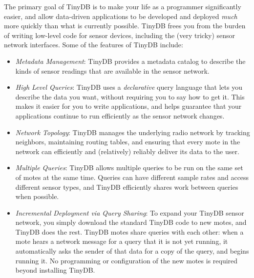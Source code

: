 \documentclass[11pt]{article}
\begin{document}
The primary goal of TinyDB is to make your life as a programmer
significantly easier, and allow data-driven applications to be
developed and deployed {\em much} more quickly than what is currently
possible.  TinyDB frees you from the burden of writing low-level code
for sensor devices, including the (very tricky) sensor network
interfaces.  Some of the features of TinyDB include:

\begin{itemize}
\item {\it Metadata Management}: TinyDB provides a metadata catalog to describe the kinds of 
sensor readings that are available in the sensor network.
\item {\it High Level Queries}: TinyDB uses a {\em
  declarative} query language that lets you
  describe the data you want, without requiring you to say how to get
  it.  This makes it easier for you to write applications, and
  helps guarantee that your applications continue to run efficiently
  as the sensor network changes.
\item {\it Network Topology}: TinyDB manages the underlying radio network by tracking
neighbors, maintaining routing tables, and ensuring that every mote in the
network can efficiently and (relatively) reliably deliver its data to the user.
\item {\it Multiple Queries}: TinyDB allows multiple queries to be run on the same
set of motes at the same time.  Queries can have different sample rates and
access different sensor types, and TinyDB efficiently shares work between
queries when possible.
\item {\it Incremental Deployment via Query Sharing}: To expand your
TinyDB sensor network, you simply download the standard TinyDB code to
new motes, and TinyDB does the rest.  TinyDB motes share queries with
each other: when a mote hears a network message for a query that it is
not yet running, it automatically asks the sender of that data for a
copy of the query, and begins running it.  No programming or
configuration of the new motes is required beyond installing TinyDB.
\end{itemize}
\end{document}
